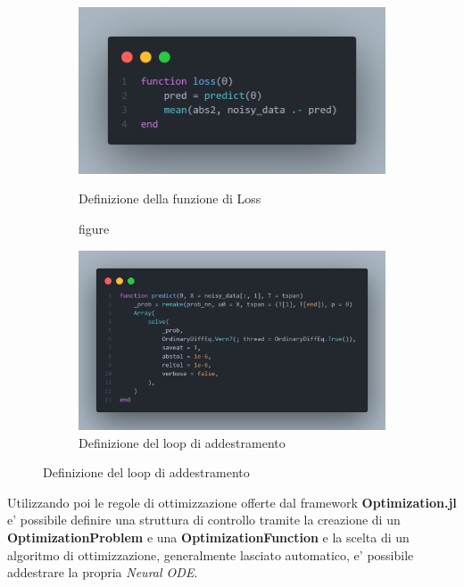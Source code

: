 \begin{figure}[!hb]
	\centering
	\begin{subfigure}[b]{0.45\textwidth}
		\centering
		\includegraphics[width=\textwidth]{img/loss.png}
		\caption{figure}{Definizione della funzione di Loss}
		\label{fig:loss_function}
	\end{subfigure}
	\hfill
	\begin{subfigure}[b]{0.45\textwidth}
		\centering
		\includegraphics[width=\textwidth]{img/predict_function.png}
		\caption{Definizione del loop di addestramento}
		\label{fig:predict_function}
	\end{subfigure}
\end{figure}

Utilizzando poi le regole di ottimizzazione offerte dal framework \textbf{Optimization.jl} \cite{vaibhav_kumar_dixit_2023_7738525}
e' possibile definire una struttura di controllo tramite la creazione di un 
\textbf{OptimizationProblem} e una \textbf{OptimizationFunction} e la scelta di un 
algoritmo di ottimizzazione, generalmente lasciato automatico, e' possibile addestrare
la propria \emph{Neural ODE}.

